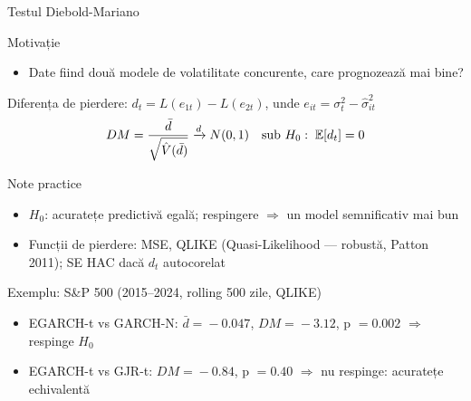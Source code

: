 \documentclass[9pt, aspectratio=169, t]{beamer}
\begin{document}
\begin{frame}{Testul Diebold-Mariano}
    \small
        \setlength{\abovedisplayskip}{1pt}\setlength{\belowdisplayskip}{1pt}
        \vspace{-0.4cm}
        \begin{block}{Motivație}
            \begin{itemize}
                \item Date fiind două modele de volatilitate concurente, care prognozează mai bine?
            \end{itemize}
        \end{block}
        \vspace{-0.3cm}
        \begin{defn}
            Diferența de pierdere: $d_t = L(e_{1t}) - L(e_{2t})$, unde $e_{it} = \sigma_t^2 - \hat{\sigma}_{it}^2$
            \[
                DM = \frac{\bar{d}}{\sqrt{\hat{V}(\bar{d})}} \xrightarrow{d} N(0,1) \quad \text{sub } H_0: \; \mathbb{E}[d_t] = 0
            \]
        \end{defn}
        \vspace{-0.35cm}
        \begin{alertblock}{Note practice}
            \begin{itemize}\setlength{\itemsep}{-1pt}
                \item $H_0$: acuratețe predictivă egală; respingere $\Rightarrow$ un model semnificativ mai bun
                \item Funcții de pierdere: MSE, QLIKE (Quasi-Likelihood --- robustă, Patton 2011); SE HAC dacă $d_t$ autocorelat
            \end{itemize}
        \end{alertblock}
        \vspace{-0.35cm}
        \begin{exampleblock}{Exemplu: S\&P 500 (2015--2024, rolling 500 zile, QLIKE)}
            \begin{itemize}\setlength{\itemsep}{-1pt}
                \item EGARCH-t vs GARCH-N: $\bar{d}\!=\!-0.047$, $DM\!=\!-3.12$, p $=0.002$ $\Rightarrow$ respinge $H_0$
                \item EGARCH-t vs GJR-t: $DM\!=\!-0.84$, p $=0.40$ $\Rightarrow$ nu respinge: acuratețe echivalentă
            \end{itemize}
        \end{exampleblock}
\end{frame}
\end{document}
